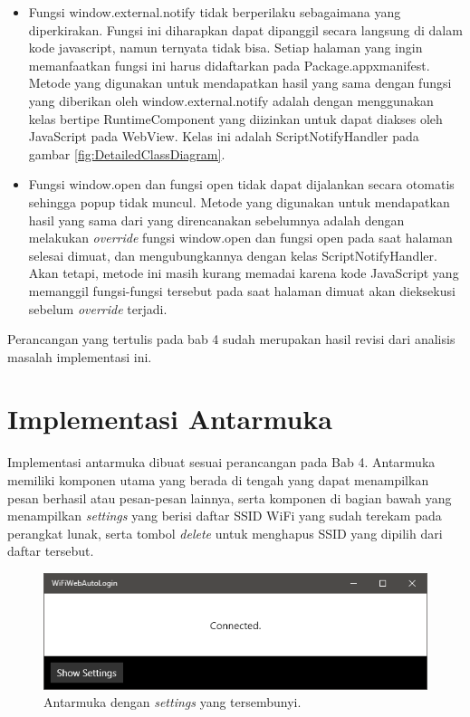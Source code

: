 \begin{itemize}
    \item{Fungsi window.external.notify tidak berperilaku sebagaimana yang diperkirakan. Fungsi ini diharapkan dapat dipanggil secara langsung di dalam kode javascript, namun ternyata tidak bisa. Setiap halaman yang ingin memanfaatkan fungsi ini harus didaftarkan pada Package.appxmanifest. Metode yang digunakan untuk mendapatkan hasil yang sama dengan fungsi yang diberikan oleh window.external.notify adalah dengan menggunakan kelas bertipe RuntimeComponent yang diizinkan untuk dapat diakses oleh JavaScript pada WebView. Kelas ini adalah ScriptNotifyHandler pada gambar \ref{fig:DetailedClassDiagram}.}
    \item{Fungsi window.open dan fungsi open tidak dapat dijalankan secara otomatis sehingga popup tidak muncul. Metode yang digunakan untuk mendapatkan hasil yang sama dari yang direncanakan sebelumnya adalah dengan melakukan \textit{override} fungsi window.open dan fungsi open pada saat halaman selesai dimuat, dan mengubungkannya dengan kelas ScriptNotifyHandler. Akan tetapi, metode ini masih kurang memadai karena kode JavaScript yang memanggil fungsi-fungsi tersebut pada saat halaman dimuat akan dieksekusi sebelum \textit{override} terjadi.}
\end{itemize}

Perancangan yang tertulis pada bab 4 sudah merupakan hasil revisi dari analisis masalah implementasi ini.



\section{Implementasi Antarmuka}
\label{sec:implementasi_antarmuka}

Implementasi antarmuka dibuat sesuai perancangan pada Bab 4. Antarmuka memiliki komponen utama yang berada di tengah yang dapat menampilkan pesan berhasil atau pesan-pesan lainnya, serta komponen di bagian bawah yang menampilkan \textit{settings} yang berisi daftar SSID WiFi yang sudah terekam pada perangkat lunak, serta tombol \textit{delete} untuk menghapus SSID yang dipilih dari daftar tersebut.

\begin{figure}[!htb]
    \centering
    \includegraphics[scale=0.9]{Gambar/ui_hidden.png}
    \caption[Antarmuka dengan \textit{settings} yang tersembunyi.]{Antarmuka dengan \textit{settings} yang tersembunyi.} 
    \label{fig:ui_hidden}
\end{figure}

